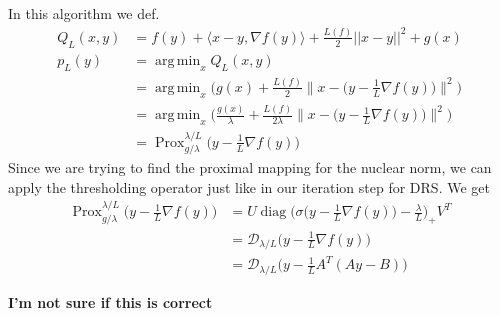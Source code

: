 \documentclass{article}
\numberwithin{equation}{section}
\DeclareMathOperator*{\argmin}{arg\,min}
\DeclareMathOperator{\Prox}{Prox}
\DeclareMathOperator{\diag}{diag}
\begin{document}
In this algorithm we def. 
\begin{align*}
Q_L(x,y) &= f(y) + \langle x-y, \nabla f(y) \rangle + \frac{L(f)}{2} ||x-y||^2 + g(x)\\
p_L(y) &= \argmin_x Q_L(x,y)\\
&= \argmin_x \Big( g(x) + \frac{L(f)}{2} \Big\| x - \Big( y - \frac{1}{L} \nabla f(y)\Big)\Big\|^2 \Big)\\
&= \argmin_x \Big( \frac{g(x)}{\lambda} + \frac{L(f)}{2\lambda} \Big\| x - \Big( y - \frac{1}{L} \nabla f(y)\Big)\Big\|^2 \Big)\\
&= \Prox_{g/\lambda}^{\lambda/L} \Big(y - \frac{1}{L}\nabla f(y)\Big)
\end{align*}
Since we are trying to find the proximal mapping for the nuclear norm, we can apply the thresholding operator just like in our iteration step for DRS. We get 
\begin{align*}
\Prox_{g/\lambda}^{\lambda/L}  \Big(y - \frac{1}{L} \nabla f(y) \Big) &= U \diag \Big(\sigma \Big(y - \frac{1}{L} \nabla f(y)\Big) - \frac{\lambda}{L}\Big)_+ V^T\\
&= \mathcal{D}_{\lambda / L}\Big(y - \frac{1}{L} \nabla f(y)\Big)\\
&= \mathcal{D}_{\lambda / L}\Big(y - \frac{1}{L} A^T(Ay - B)\Big)
\end{align*}

\textbf{I'm not sure if this is correct}
\end{document}
